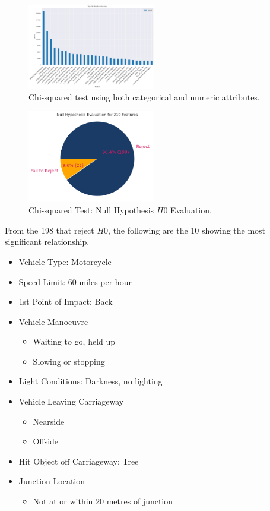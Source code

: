 \begin{figure}[ht]
    \centering
    \includegraphics[width=0.5\textwidth]{images/ChiSquared_Feature_Scores}
    \caption{Chi-squared test using both categorical and numeric attributes.}
    \label{fig:chi_squared_test}
\end{figure}
\begin{figure}[ht]
    \centering
    \includegraphics[width=0.5\textwidth]{images/Null_Hypothesis_Evaluation_pie}
    \caption{Chi-squared Test: Null Hypothesis $H0$ Evaluation.}
    \label{fig:null_hypothesis}
\end{figure}

From the 198 that reject $H0$, the following are the 10 showing the most significant relationship.

\begin{itemize}
    \item Vehicle Type: Motorcycle
    \item Speed Limit: 60 miles per hour
    \item 1st Point of Impact: Back
    \item Vehicle Manoeuvre
    \begin{itemize}
        \item Waiting to go, held up
        \item Slowing or stopping
    \end{itemize}
    \item Light Conditions:  Darkness, no lighting
    \item Vehicle Leaving Carriageway
    \begin{itemize}
        \item Nearside
        \item Offside
    \end{itemize}
    \item Hit Object off Carriageway: Tree
    \item Junction Location
    \begin{itemize}
        \item Not at or within 20 metres of junction
    \end{itemize}
\end{itemize}

